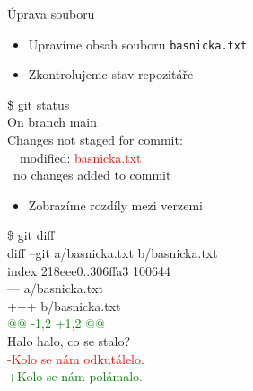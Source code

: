 \documentclass{beamer}
\begin{document}
	
\begin{frame}[fragile]{Úprava souboru}
	
	\begin{itemize}
		\item Upravíme obsah souboru \texttt{basnicka.txt}
		\item Zkontrolujeme stav repozitáře
	\end{itemize}
	
	{\ttfamily\small
		\$ git status \\
		On branch main \\
		Changes not staged for commit: \\
		\ \ modified: \textcolor{red}{basnicka.txt} \\
		\ no changes added to commit
	}
	
	\hspace{0.5cm}
	\begin{itemize}
		\item Zobrazíme rozdíly mezi verzemi
	\end{itemize}
	
	{\ttfamily\small
		\$ git diff \\
		diff --git a/basnicka.txt b/basnicka.txt \\
		index 218eee0..306ffa3 100644 \\
		--- a/basnicka.txt \\
		+++ b/basnicka.txt \\
		\textcolor{green}{@@ -1,2 +1,2 @@} \\
		Halo halo, co se stalo? \\
		\textcolor{red}{-Kolo se nám odkutálelo.} \\
		\textcolor{green}{+Kolo se nám polámalo.}
	}
	
\end{frame}
\end{document}
